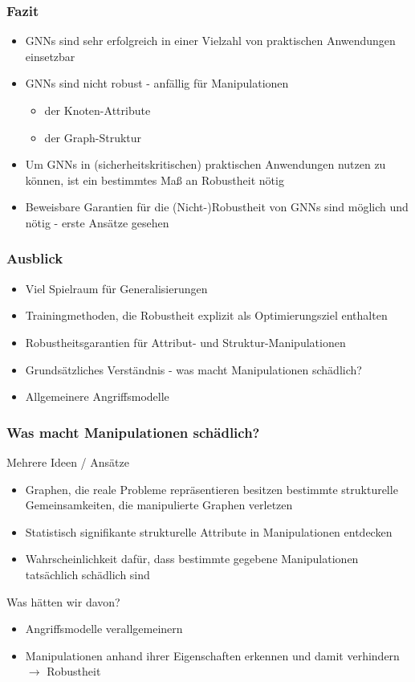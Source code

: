 \documentclass{beamer}
\begin{document}
\begin{frame}
  \frametitle{Fazit}

  \begin{itemize}
    \item GNNs sind sehr erfolgreich in einer Vielzahl von praktischen Anwendungen einsetzbar
    \item GNNs sind nicht robust - anfällig für Manipulationen
    \begin{itemize}
      \item der Knoten-Attribute
      \item der Graph-Struktur
    \end{itemize}
    \item Um GNNs in (sicherheitskritischen) praktischen Anwendungen nutzen zu können, ist ein bestimmtes Maß an Robustheit nötig
    \item Beweisbare Garantien für die (Nicht-)Robustheit von GNNs sind möglich und nötig - erste Ansätze gesehen
  \end{itemize}
\end{frame}

\begin{frame}
  \frametitle{Ausblick}

  \begin{itemize}
    \item Viel Spielraum für Generalisierungen
    \item Trainingmethoden, die Robustheit explizit als Optimierungsziel enthalten
    \item Robustheitsgarantien für Attribut- und Struktur-Manipulationen
    \item Grundsätzliches Verständnis - was macht Manipulationen schädlich?
    \item Allgemeinere Angriffsmodelle
  \end{itemize}
\end{frame}

\begin{frame}
  \frametitle{Was macht Manipulationen schädlich?}

  Mehrere Ideen / Ansätze

  \begin{itemize}
    \item Graphen, die reale Probleme repräsentieren besitzen bestimmte strukturelle Gemeinsamkeiten, die manipulierte Graphen verletzen
    \item Statistisch signifikante strukturelle Attribute in Manipulationen entdecken
    \item Wahrscheinlichkeit dafür, dass bestimmte gegebene Manipulationen tatsächlich schädlich sind
  \end{itemize}

  Was hätten wir davon?

  \begin{itemize}
    \item Angriffsmodelle verallgemeinern
    \item Manipulationen anhand ihrer Eigenschaften erkennen und damit verhindern $\rightarrow$ Robustheit
  \end{itemize}

\end{frame}

\begin{frame}[allowframebreaks]
  
  
\end{frame}
\end{document}

